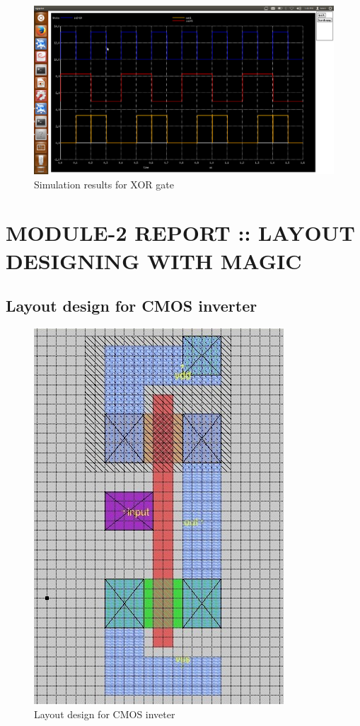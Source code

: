 \documentclass[12pt,a4paper]{article}
\begin{document}
\begin{center}
\begin{figure}[h]
\centering
\includegraphics[scale=.4]{xor1sim.png}
\caption[Short]{Simulation results for XOR gate}
\end{figure}

\clearpage
\section{MODULE-2 REPORT :: LAYOUT DESIGNING WITH MAGIC}

\subsection{Layout design for CMOS inverter}
\vspace{15pt}
\begin{figure}[h]
\centering
\includegraphics[scale=.8]{inv_magic.jpg}
\caption[Short]{Layout design for CMOS inveter }
\end{figure}



\end{center}
\end{document}
